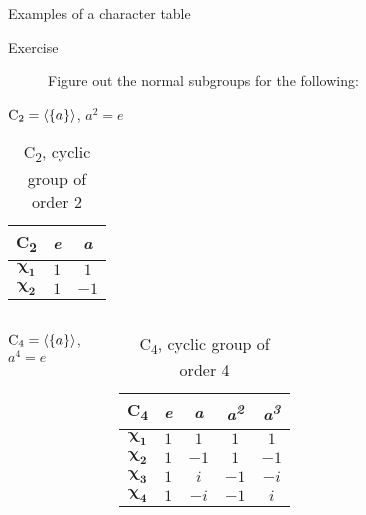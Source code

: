 \documentclass{beamer}
\begin{document}
\begin{frame}{Examples of a character table}
    \centering
    \begin{description}
        \item[Exercise] Figure out the normal subgroups for the following:
    \end{description}
    \vspace{0.1em}
    \centering
    $\text{C\textsubscript{2}}=\langle\{a\}\rangle$, $a^2=e$
    \begin{table}[]
        \centering
        \setlength\extrarowheight{3pt}
        \begin{tabular}{|c|c|c|}
            \hline\textbf{C\textsubscript{2}} & \textbf{\textit{e}} & \textbf{\textit{a}} \\ \hline
            $\boldsymbol{\chi_1}$ & $1$ & $1$ \\ \hline
            $\boldsymbol{\chi_2}$ & $1$ & $-1$ \\ \hline
        \end{tabular}
        \caption{C\textsubscript{2}, cyclic group of order 2}
    \end{table}
    \vspace{-0.4em}
    \begin{columns}
        \centering
        $\text{C\textsubscript{4}}=\langle\{a\}\rangle$, $a^4=e$
        \vspace{-0.2em}
        \begin{table}[]
            \centering
            \setlength\extrarowheight{3pt}
            \begin{tabular}{|c|c|c|c|c|}
                \hline\textbf{C\textsubscript{4}} & \textbf{\textit{e}} & \textbf{\textit{a}} & \textbf{\textit{a\textsuperscript{2}}} & \textbf{\textit{a\textsuperscript{3}}} \\ \hline
                $\boldsymbol{\chi_1}$ & $1$ & $1$ & $1$ & $1$ \\ \hline
                $\boldsymbol{\chi_2}$ & $1$ & $-1$ & $1$ & $-1$ \\ \hline
                $\boldsymbol{\chi_3}$ & $1$ & $i$ & $-1$ & $-i$ \\ \hline
                $\boldsymbol{\chi_4}$ & $1$ & $-i$ & $-1$ & $i$ \\ \hline
            \end{tabular}
            \caption{C\textsubscript{4}, cyclic group of order 4}
        \end{table}

\end{columns}
\end{frame}
\end{document}
